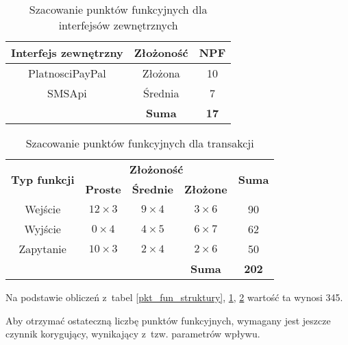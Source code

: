 \documentclass[12pt,leqno,twoside]{mwart}
\begin{document}
\begin{table}[h]
	\centering
	\caption{Szacowanie punktów funkcyjnych dla interfejsów zewnętrznych}
		\rule{0pt}{3ex}
		\begin{tabular}{c|c|c|}
		\hline
		\multicolumn{1}{|c|}{\textbf{Interfejs zewnętrzny}} & \textbf{Złożoność} & \textbf{NPF} \\ \hline
		\multicolumn{1}{|c|}{PlatnosciPayPal} 	& Złożona 	& 10 \\ \hline
		\multicolumn{1}{|c|}{SMSApi} 		& Średnia 	& 7 \\ \hline
					& \textbf{Suma}	& \textbf{17} \\ \cline{2-3}
		\end{tabular}
	\label{pkt_fun_zew}
\end{table}
\begin{table}[h]
	\centering
	\caption{Szacowanie punktów funkcyjnych dla transakcji}
		\rule{0pt}{3ex}
		\begin{tabular}{ccc|c|c|}
		\hline
		
		\multicolumn{1}{|c|}{\multirow{2}{*}{\textbf{Typ funkcji}}}	& \multicolumn{3}{c|}{\textbf{Złożoność}}	&	\multirow{2}{*}{\textbf{Suma}} \\ \cline{2-4}
		\multicolumn{1}{|c|}{} & \multicolumn{1}{c|}{\textbf{Proste}}	& \textbf{Średnie} &	\textbf{Złożone} & \\ \hline
		\multicolumn{1}{|c|}{Wejście} 		& \multicolumn{1}{c|}{$12 \times 3$} & $9 \times 4$ & $3 \times 6$ & 90 \\ \hline
		\multicolumn{1}{|c|}{Wyjście}		& \multicolumn{1}{c|}{$0 \times 4$} & $4 \times 5$ & $6 \times 7$ & 62 \\ \hline
		\multicolumn{1}{|c|}{Zapytanie}		& \multicolumn{1}{c|}{$10 \times 3$} & $2 \times 4$ & $2 \times 6$ & 50 \\ \hline
			&	&	& \textbf{Suma}	& \textbf{202} \\ \cline{4-5}
		\end{tabular}
	\label{pkt_fun_trans}
\end{table}
Na podstawie obliczeń z~tabel \ref{pkt_fun_struktury}, \ref{pkt_fun_zew}, \ref{pkt_fun_trans} wartość ta wynosi 345.

Aby otrzymać ostateczną liczbę punktów funkcyjnych, wymagany jest jeszcze czynnik korygujący, wynikający z~tzw. parametrów wpływu.
\end{document}

